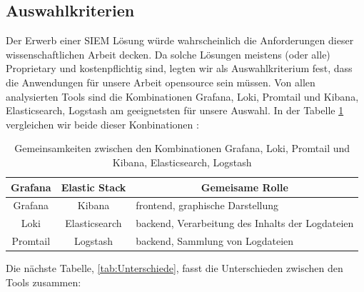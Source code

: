 \subsection{Auswahlkriterien}
Der Erwerb einer \gls{SIEM} Lösung würde wahrscheinlich die Anforderungen dieser wissenschaftlichen Arbeit decken. Da solche Lösungen meistens (oder alle) \gls{Proprietary} und kostenpflichtig sind, legten wir als Auswahlkriterium fest, dass die Anwendungen für unsere Arbeit \gls{opensource} sein müssen. Von allen analysierten Tools sind die Kombinationen Grafana, Loki, Promtail und Kibana, Elasticsearch, Logstash  am geeignetsten für unsere Auswahl. In der Tabelle \ref{tab:Vergleich_GrafanaELK} vergleichen wir beide dieser Konbinationen \citep{Anand_LokixELK}:

\begin{table}[H]
   \begin{tabularx}{\textwidth}{|c|c|X|}
   \hline
   \multicolumn{1}{|c|}{\textbf{Grafana}} & \multicolumn{1}{|c|}{\textbf{Elastic Stack}} & \multicolumn{1}{|c|}{\textbf{Gemeisame Rolle}} \\
   \hline
      Grafana & Kibana & \gls{frontend}, graphische Darstellung\\
   \hline
      Loki & Elasticsearch & \gls{backend}, Verarbeitung des Inhalts der Logdateien \\
   \hline
      Promtail & Logstash & \gls{backend}, Sammlung von Logdateien \\
      \hline
   \end{tabularx}
   \caption[Gemeinsamkeiten zwischen den Kombinationen Grafana, Loki, Promtail und Kibana, Elasticsearch, Logstash]
   {Gemeinsamkeiten zwischen den Kombinationen Grafana, Loki, Promtail und Kibana, Elasticsearch, Logstash}
   \label{tab:Vergleich_GrafanaELK}
\end{table}

Die nächste Tabelle, \ref{tab:Unterschiede}, fasst die Unterschieden zwischen den Tools zusammen:

